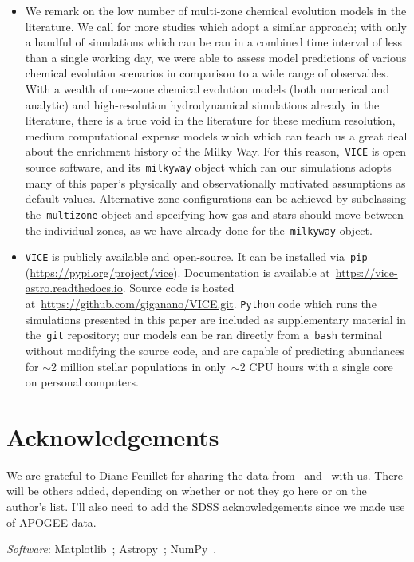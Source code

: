 \documentclass[fleqn, usenatbib]{mnras}
\begin{document}
\begin{itemize}
	\item We remark on the low number of multi-zone 
	chemical evolution models in the literature. We call for more studies 
	which adopt a similar approach; with only a handful of simulations which 
	can be ran in a combined time interval of less than a single working day, 
	we were able to assess model predictions of various chemical evolution 
	scenarios in comparison to a wide range of observables. With a wealth of 
	one-zone chemical evolution models (both numerical and analytic) and 
	high-resolution hydrodynamical simulations already in the literature, 
	there is a true void in the literature for these medium resolution, medium 
	computational expense models which which can teach us a great deal about 
	the enrichment history of the Milky Way. For this reason,~\texttt{VICE} 
	is open source software, and its~\texttt{milkyway} object which ran our 
	simulations adopts many of this paper's physically and observationally 
	motivated assumptions as default values. Alternative zone configurations 
	can be achieved by subclassing the~\texttt{multizone} object and 
	specifying how gas and stars should move between the individual zones, as 
	we have already done for the~\texttt{milkyway} object. 

	\item \texttt{VICE} is publicly available and open-source. It can be 
	installed via~\texttt{pip} (\url{https://pypi.org/project/vice}). 
	Documentation is available at~\url{https://vice-astro.readthedocs.io}. 
	Source code is hosted at~\url{https://github.com/giganano/VICE.git}. 
	\texttt{Python} code which runs the simulations presented in this paper 
	are included as supplementary material in the~\texttt{git} repository; 
	our models can be ran directly from a~\texttt{bash} terminal without 
	modifying the source code, and are capable of predicting abundances for 
	$\sim$2 million stellar populations in only~$\sim$2 CPU hours with a 
	single core on personal computers. 
\end{itemize} 

\section{Acknowledgements} 
\label{sec:acknowledgements} 
We are grateful to Diane Feuillet for sharing the data 
from~\citet{Feuillet2018} and~\citet{Feuillet2019} with us. {\color{red} There 
will be others added, depending on whether or not they go here or on the 
author's list. I'll also need to add the SDSS acknowledgements since we made 
use of APOGEE data.} 
\par 
\textit{Software}: Matplotlib~\citep{Matplotlib}; Astropy~\citep{Astropy2013, 
Astropy2018}; NumPy~\citep{NumPy}. 
\end{document}
